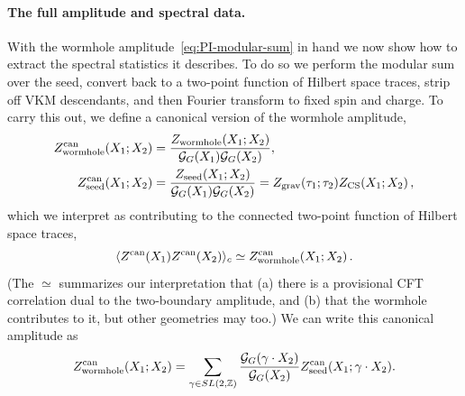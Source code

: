 \documentclass[11pt]{article}
\numberwithin{equation}{section}
\begin{document}
\paragraph{The full amplitude and spectral data.}
With the wormhole amplitude~\eqref{eq:PI-modular-sum} in hand we now show how to extract the spectral statistics it describes. To do so we perform the modular sum over the seed, convert back to a two-point function of Hilbert space traces, strip off VKM descendants, and then Fourier transform to fixed spin and charge. To carry this out, we define a canonical version of the wormhole amplitude, 
\begin{equation}
\begin{aligned}
 Z_{\rm wormhole}^{\mathrm{can}}(X_1;X_2)
 &=\frac{Z_{\rm wormhole}(X_1;X_2)}
 {\mathcal G_G(X_1)\mathcal G_G(X_2)},\\
 Z_{\rm seed}^{\mathrm{can}}(X_1;X_2)
 &=\frac{Z_{\rm seed}(X_1;X_2)}
 {\mathcal G_G(X_1)\mathcal G_G(X_2)}
 =Z_{\rm grav}(\tau_1;\tau_2)Z_{\rm CS}(X_1;X_2)\,,
\end{aligned}
\label{eq:PI-seed-conversion}
\end{equation}
which we interpret as contributing to the connected two-point function of Hilbert space traces,
\begin{equation}
    \langle Z^{\rm can}(X_1)Z^{\rm can}(X_2)\rangle_c \simeq Z^{\rm can}_{\rm wormhole}(X_1;X_2) \,.
\end{equation}
(The $\simeq$ summarizes our interpretation that (a) there is a provisional CFT correlation dual to the two-boundary amplitude, and (b) that the wormhole contributes to it, but other geometries may too.)
We can write this canonical amplitude as
\begin{equation}
Z_{\rm wormhole}^{\mathrm{can}}(X_1;X_2)
 =\sum_{\gamma\in SL(2,\mathbb Z)}
 \frac{\mathcal G_G(\gamma\cdot X_2)}{\mathcal G_G(X_2)}
 Z_{\rm seed}^{\mathrm{can}}(X_1;\gamma\cdot X_2).
\label{eq:canonical-modular-sum}
\end{equation}
\end{document}

